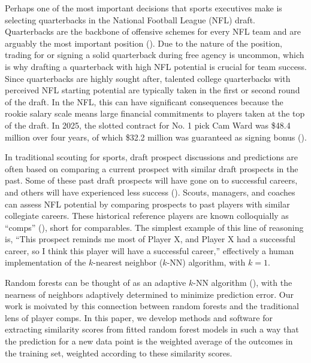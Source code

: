 \documentclass{article}
\begin{document}
Perhaps one of the most important decisions that sports executives make is selecting quarterbacks in the National Football League (NFL) draft. Quarterbacks are the backbone of offensive schemes for every NFL team and are arguably the most important position (\cite{hughes_positional_2015}). Due to the nature of the position, trading for or signing a solid quarterback during free agency is uncommon, which is why drafting a quarterback with high NFL potential is crucial for team success. Since quarterbacks are highly sought after, talented college quarterbacks with perceived NFL starting potential are typically taken in the first or second round of the draft. In the NFL, this can have significant consequences because the rookie salary scale means large financial commitments to players taken at the top of the draft. In 2025, the slotted contract for No. 1 pick Cam Ward was \$48.4 million over four years, of which \$32.2 million was guaranteed as signing bonus (\cite{badenhausen_nfl_2025}).

In traditional scouting for sports, draft prospect discussions and predictions are often based on comparing a current prospect with similar draft prospects in the past. Some of these past draft prospects will have gone on to successful careers, and others will have experienced less success (\cite{trapasso_nfl_2025}). Scouts, managers, and coaches can assess NFL potential by comparing prospects to past players with similar collegiate careers. These historical reference players are known colloquially as ``comps'' (\cite{jones_nfl_2025}), short for comparables. The simplest example of this line of reasoning is, ``This prospect reminds me most of Player X, and Player X had a successful career, so I think this player will have a successful career,'' effectively a human implementation of the $k$-nearest neighbor ($k$-NN) algorithm, with $k = 1$.

Random forests can be thought of as an adaptive $k$-NN algorithm (\cite{lin_random_2006}), with the nearness of neighbors adaptively determined to minimize prediction error. Our work is moivated by this connection between random forests and the traditional lens of player comps. In this paper, we develop methods and software for extracting similarity scores from fitted random forest models in such a way that the prediction for a new data point is the weighted average of the outcomes in the training set, weighted according to these similarity scores.
\end{document}
